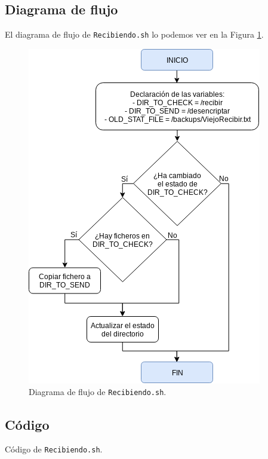 \subsection{Diagrama de flujo}
El diagrama de flujo de \texttt{Recibiendo.sh} lo podemos ver en la Figura \ref{Diagrama de flujo de Recibiendo.sh}.
\begin{figure}[h]
	\centering
	\includegraphics[scale=0.8]{Anexos/Anexo3/Diagramas/Recibiendo.png}
	\caption{Diagrama de flujo de \texttt{Recibiendo.sh}.}
	\label{Diagrama de flujo de Recibiendo.sh}
\end{figure}

\subsection{Código}

\begin{center}
	Código de \texttt{Recibiendo.sh}.
\end{center}

